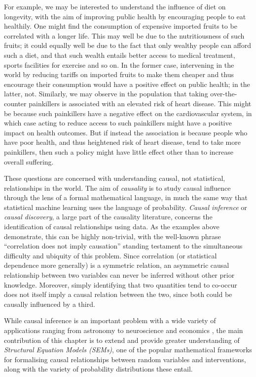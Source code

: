For example, we may be interested to understand the influence of diet on longevity, with the aim of improving public health by encouraging people to eat healthily. 
One might find the consumption of expensive imported fruits to be correlated with a longer life. This may well be due to the nutritiousness of such fruits; it could equally well be due to the fact that only wealthy people can afford such a diet, and that such wealth entails better access to medical treatment, sports facilities for exercise and so on. In the former case, intervening in the world by reducing tariffs on imported fruits to make them cheaper and thus encourage their consumption would have a positive effect on public health; in the latter, not.
Similarly, we may observe in the population that taking over-the-counter painkillers is associated with an elevated risk of heart disease. This might be because such painkillers have a negative effect on the cardiovascular system, in which case acting to reduce access to such painkillers might have a positive impact on health outcomes. But if instead the association is because people who have poor health, and thus heightened risk of heart disease, tend to take more painkillers, then such a policy might have little effect other than to increase overall suffering.

These questions are concerned with understanding causal, not statistical, relationships in the world. 
The aim of \emph{causality} is to study causal influence through the lens of a formal mathematical language, in much the same way that statistical machine learning uses the language of probability. 
\emph{Causal inference} or \emph{causal discovery}, a large part of the causality literature, concerns the identification of causal relationships using data.
As the examples above demonstrate, this can be highly non-trivial, with the well-known phrase ``correlation does not imply causation'' standing testament to the simultaneous difficulty and ubiquity of this problem.
Since correlation (or statistical dependence more generally) is a symmetric relation, an asymmetric causal relationship between two variables can never be inferred without other prior knowledge. 
Moreover, simply identifying that two quantities tend to co-occur does not itself imply a causal relation between the two, since both could be causally influenced by a third.

While causal inference is an important problem with a wide variety of applications ranging from astronomy to neuroscience and economics \citep{scholkopf2016modeling, ding200617, hicks1980causality}, the main contribution of this chapter is to extend and provide greater understanding of \emph{Structural Equation Models (SEMs)}, one of the popular mathematical frameworks for formalising causal relationships between random variables and interventions, along with the variety of probability distributions these entail.
 
